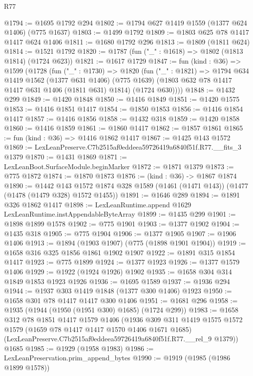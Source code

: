 \begin{lexlean}{R77}
\begin{coremodule}
{{@1794 := @1695 @1792 @294
@1802 := @1794 @627 @1419 @1559 (@1377 @624 @1406) (@775 @1637)
@1803 := @1499 @1792
@1809 := @1803 @625 @78 @1417 @1417 @624 @1406
@1811 := @1680 @1792 @296
@1813 := @1809 (@1811 @624)
@1814 := @1521 @1792
@1820 := @1787 (fun ("_" : @1618) => @1802 (@1813 @1814) (@1724 @623))
@1821 := @1617 @1729
@1847 := fun (kind : @36) =>
  @1599
    (@1728
      (fun ("_" : @1730) =>
      @1820
        (fun ("_" : @1821) =>
        @1794
          @634
          @1419
          @1562
          (@1377 @631 @1406)
          (@775 @1639)
          (@1803 @632 @78 @1417 @1417 @631 @1406 (@1811 @631) @1814)
          (@1724 @630))))
@1848 := @1432 @299
@1849 := @1420 @1848
@1850 := @1416 @1849
@1851 := @1420 @1575
@1853 := @1416 @1851 @1417
@1854 := @1850 @1853
@1856 := @1416 @1854 @1417
@1857 := @1416 @1856
@1858 := @1432 @318
@1859 := @1420 @1858
@1860 := @1416 @1859
@1861 := @1860 @1417
@1862 := @1857 @1861
@1865 := fun (kind : @36) => @1416 @1862 @1417
@1867 := @1425 @143 @1572
@1869 := LexLeanPreserve.C7b2515af0eddeea59726419a6840f51f.R77.__fits_3 @1379
@1870 := @1431 @1869
@1871 := LexLeanBoot.SurfaceModule.beginMarker
@1872 := @1871 @1379
@1873 := @775 @1872
@1874 := @1870 @1873
@1876 := (kind : @36) -> @1867 @1874
@1890 := @1442
    @143
    @1572
    @1874
    @328
    @1589
    (@1461 (@1471 @143))
    (@1477 (@1478 (@1479 @328) @1572 @1455))
@1891 := @1646 @289
@1894 := @1891 @326 @1862 @1417
@1898 := LexLeanRuntime.append @1629 LexLeanRuntime.instAppendableByteArray
@1899 := @1435 @299
@1901 := @1898 @1899 @1578
@1902 := @775 @1901
@1903 := @1377 @1902
@1904 := @1435 @318
@1905 := @775 @1904
@1906 := @1377 @1905
@1907 := @1906 @1406
@1913 := @1894 (@1903 @1907) (@775 (@1898 @1901 @1904))
@1919 := @1658 @316 @325 @1856 @1861 @1902 @1907
@1922 := @1891 @315 @1854 @1417
@1923 := @775 @1899
@1924 := @1377 @1923
@1926 := @1377 @1579 @1406
@1929 := @1922 (@1924 @1926) @1902
@1935 := @1658 @304 @314 @1849 @1853 @1923 @1926
@1936 := @1695 @1589
@1937 := @1936 @294
@1944 := @1937 @303 @1419 @1848 (@1377 @300 @1406) @1923
@1950 := @1658 @301 @78 @1417 @1417 @300 @1406
@1951 := @1681 @296
@1958 := @1935 (@1944 (@1950 (@1951 @300) @1685) (@1724 @299))
@1983 := @1658
    @312
    @78
    @1851
    @1417
    @1579
    @1406
    (@1936
      @309
      @311
      @1419
      @1575
      @1572
      @1579
      (@1659 @78 @1417 @1417 @1570 @1406 @1671 @1685)
      (LexLeanPreserve.C7b2515af0eddeea59726419a6840f51f.R77.__rel_9 @1379))
    @1685
@1985 := @1929 (@1958 @1983)
@1986 := LexLeanPreservation.prim_append_bytes
@1990 := @1919 (@1985 (@1986 @1899 @1578))
}}
\end{coremodule}
\end{lexlean}
